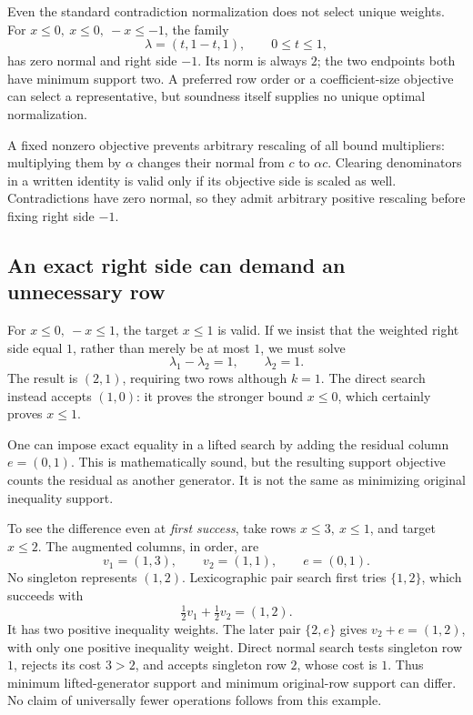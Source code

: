 \documentclass[11pt,letterpaper]{article}
\theoremstyle{definition}
\theoremstyle{remark}
\numberwithin{equation}{section}
\begin{document}
Even the standard contradiction normalization does not select unique weights.
For \(x\le0,\ x\le0,\ -x\le-1\), the family
\[
 \lambda=(t,1-t,1),\qquad 0\le t\le1,
\]
has zero normal and right side \(-1\). Its norm is always \(2\); the two
endpoints both have minimum support two.
A preferred row order or a coefficient-size objective can select a
representative, but soundness itself supplies no unique optimal
normalization.

A fixed nonzero objective prevents arbitrary rescaling of all bound
multipliers: multiplying them by \(\alpha\) changes their normal from
\(c\) to \(\alpha c\). Clearing denominators in a written identity is valid
only if its objective side is scaled as well. Contradictions have zero
normal, so they admit arbitrary positive rescaling before fixing right
side \(-1\).

\subsection{An exact right side can demand an unnecessary row}

For \(x\le0,\ -x\le1\), the target \(x\le1\) is valid.
If we insist that the weighted right side equal \(1\), rather than merely
be at most \(1\), we must solve
\[
 \lambda_1-\lambda_2=1,\qquad \lambda_2=1.
\]
The result is \((2,1)\), requiring two rows although \(k=1\).
The direct search instead accepts \((1,0)\): it proves the stronger bound
\(x\le0\), which certainly proves \(x\le1\).

One can impose exact equality in a lifted search by adding the residual
column \(e=(0,1)\). This is mathematically sound, but the resulting support
objective counts the residual as another generator.
It is not the same as minimizing original inequality support.

To see the difference even at \emph{first success}, take rows
\(x\le3,\ x\le1\), and target \(x\le2\).
The augmented columns, in order, are
\[
 v_1=(1,3),\qquad v_2=(1,1),\qquad e=(0,1).
\]
No singleton represents \((1,2)\). Lexicographic pair search first tries
\(\{1,2\}\), which succeeds with
\[
 \tfrac12v_1+\tfrac12v_2=(1,2).
\]
It has two positive inequality weights. The later pair \(\{2,e\}\) gives
\(v_2+e=(1,2)\), with only one positive inequality weight.
Direct normal search tests singleton row \(1\), rejects its cost \(3>2\),
and accepts singleton row \(2\), whose cost is \(1\).
Thus minimum lifted-generator support and minimum original-row support
can differ. No claim of universally fewer operations follows from this
example.
\end{document}
